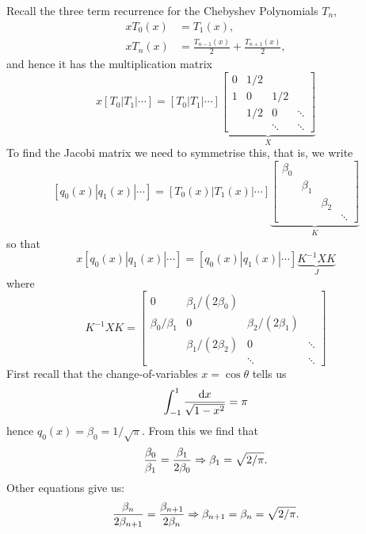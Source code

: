 \documentclass[12pt,a4paper]{article}
\begin{document}
Recall the three term recurrence for the Chebyshev Polynomials $T_n$,
\begin{align*}
	xT_0(x) &= T_1(x), \\
	xT_n(x) &= \frac{T_{n-1}(x)}{2} + \frac{T_{n+1}(x)}{2},
\end{align*}
and hence it has the multiplication matrix
\[
x [T_0 | T_1 | \ensuremath{\cdots}] = [T_0 | T_1 | \ensuremath{\cdots}] \underbrace{\begin{bmatrix} 0 & 1/2 \\
													1 & 0 & 1/2 \\
														& 1/2 & 0 & \ensuremath{\ddots} \\
														&&\ensuremath{\ddots} & \ensuremath{\ddots}
														\end{bmatrix}}_X
\]
To find the Jacobi matrix we need to symmetrise this, that is, we write
\[
[q_0(x) | q_1(x) | \ensuremath{\cdots} ] = [T_0(x) | T_1(x)| \ensuremath{\cdots}] \underbrace{\begin{bmatrix}  \ensuremath{\beta}_0 \\ & \ensuremath{\beta}_1 \\ && \ensuremath{\beta}_2 \\ &&& \ensuremath{\ddots} \end{bmatrix}}_K
\]
so that
\[
x [q_0(x) | q_1(x) | \ensuremath{\cdots} ] = [q_0(x) | q_1(x) | \ensuremath{\cdots} ] \underbrace{K^{-1} X K}_{J}
\]
where
\[
 K^{-1} X K = \begin{bmatrix} 0 & \ensuremath{\beta}_1/(2\ensuremath{\beta}_0) \\
													\ensuremath{\beta}_0/\ensuremath{\beta}_1 & 0 & \ensuremath{\beta}_2/(2\ensuremath{\beta}_1) \\
														& \ensuremath{\beta}_1/(2\ensuremath{\beta}_2) & 0 & \ensuremath{\ddots} \\
														&&\ensuremath{\ddots} & \ensuremath{\ddots}
														\end{bmatrix}
\]
First recall that the change-of-variables $x = \cos \ensuremath{\theta}$ tells us
\[
\ensuremath{\int}_{-1}^1 {{\rm d}x \over \sqrt{1-x^2}} = \ensuremath{\pi}
\]
hence $q_0(x) = \ensuremath{\beta}_0 =  1/\sqrt{\ensuremath{\pi}}$. From this we find that
\[
{\ensuremath{\beta}_0 \over \ensuremath{\beta}_1} = {\ensuremath{\beta}_1 \over 2\ensuremath{\beta}_0} \ensuremath{\Rightarrow} \ensuremath{\beta}_1 = \sqrt{2/\ensuremath{\pi}}.
\]
Other equations give us:
\[
{\ensuremath{\beta}_n \over 2 \ensuremath{\beta}_{n+1}} = {\ensuremath{\beta}_{n+1} \over 2\ensuremath{\beta}_n} \ensuremath{\Rightarrow} \ensuremath{\beta}_{n+1} = \ensuremath{\beta}_n = \sqrt{2/\ensuremath{\pi}}.
\]
\end{document}
